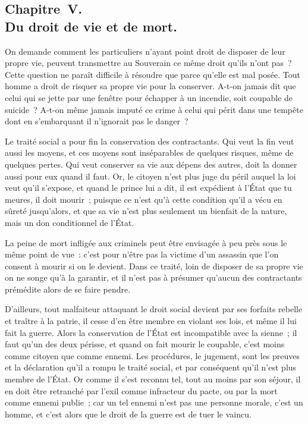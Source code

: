 \documentclass[french,twoside]{book} %
\begin{document}
\subsection[{Chapitre V. Du droit de vie et de mort.}]{Chapitre V. \\
Du droit de vie et de mort.}
\noindent On demande comment les particuliers n’ayant point droit de disposer de leur propre vie, peuvent transmettre au Souverain ce même droit qu’ils n’ont pas ? Cette question ne paraît difficile à résoudre que parce qu’elle est mal posée. Tout homme a droit de risquer sa propre vie pour la conserver. A-t-on jamais dit que celui qui se jette par une fenêtre pour échapper à un incendie, soit coupable de suicide ? A-t-on même jamais imputé ce crime à celui qui périt dans une tempête dont en s’embarquant il n’ignorait pas le danger ?\par
Le traité social a pour fin la conservation des contractants. Qui veut la fin veut aussi les moyens, et ces moyens sont inséparables de quelques risques, même de quelques pertes. Qui veut conserver sa vie aux dépens des autres, doit la donner aussi pour eux quand il faut. Or, le citoyen n’est plus juge du péril auquel la loi veut qu’il s’expose, et quand le prince lui a dit, il est expédient à l’État que tu meures, il doit mourir ; puisque ce n’est qu’à cette condition qu’il a vécu en sûreté jusqu’alors, et que sa vie n’est plus seulement un bienfait de la nature, mais un don conditionnel de l’État.\par
La peine de mort infligée aux criminels peut être envisagée à peu près sous le même point de vue : c’est pour n’être pas la victime d’un assassin que l’on consent à mourir si on le devient. Dans ce traité, loin de disposer de sa propre vie on ne songe qu’à la garantir, et il n’est pas à présumer qu’aucun des contractants prémédite alors de se faire pendre.\par
D’ailleurs, tout malfaiteur attaquant le droit social devient par ses forfaits rebelle et traître à la patrie, il cesse d’en être membre en violant ses lois, et même il lui fait la guerre. Alors la conservation de l’État est incompatible avec la sienne ; il faut qu’un des deux périsse, et quand on fait mourir le coupable, c’est moins comme citoyen que comme ennemi. Les procédures, le jugement, sont les preuves et la déclaration qu’il a rompu le traité social, et par conséquent qu’il n’est plus membre de l’État. Or comme il s’est reconnu tel, tout au moins par son séjour, il en doit être retranché par l’exil comme infracteur du pacte, ou par la mort comme ennemi publie ; car un tel ennemi n’est pas une personne morale, c’est un homme, et c’est alors que le droit de la guerre est de tuer le vaincu.\par
\end{document}
